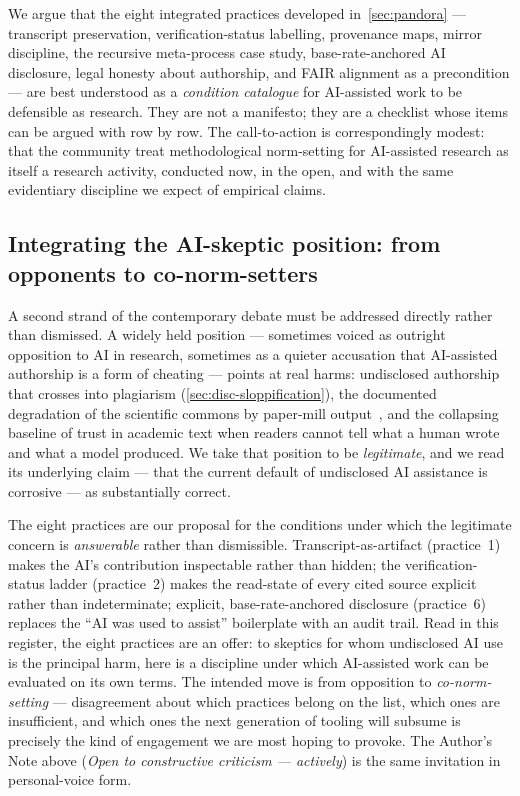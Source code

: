 \documentclass[11pt,a4paper]{article}
\begin{document}
We argue that the eight integrated practices developed in~\cref{sec:pandora}
--- transcript preservation, verification-status labelling, provenance
maps, mirror discipline, the recursive meta-process case study,
base-rate-anchored AI disclosure, legal honesty about authorship, and
FAIR alignment as a precondition --- are best understood as a
\emph{condition catalogue} for AI-assisted work to be defensible as
research. They are not a manifesto; they are a checklist whose items
can be argued with row by row. The call-to-action is correspondingly
modest: that the community treat methodological norm-setting for
AI-assisted research as itself a research activity, conducted now, in
the open, and with the same evidentiary discipline we expect of
empirical claims.

\subsection{Integrating the AI-skeptic position: from opponents to co-norm-setters}
\label{sec:ai-skeptic-integration}

A second strand of the contemporary debate must be addressed directly
rather than dismissed. A widely held position --- sometimes voiced as
outright opposition to AI in research, sometimes as a quieter accusation
that AI-assisted authorship is a form of cheating --- points at real
harms: undisclosed authorship that crosses into plagiarism
(\cref{sec:disc-sloppification}), the documented degradation of the
scientific commons by paper-mill output~\citep{suchak2025nhanes}, and
the collapsing baseline of trust in academic text when readers cannot
tell what a human wrote and what a model produced. We take that
position to be \emph{legitimate}, and we read its underlying claim ---
that the current default of undisclosed AI assistance is corrosive ---
as substantially correct.

The eight practices are our proposal for the conditions under which the
legitimate concern is \emph{answerable} rather than dismissible.
Transcript-as-artifact (practice~1) makes the AI's contribution
inspectable rather than hidden; the verification-status ladder
(practice~2) makes the read-state of every cited source explicit rather
than indeterminate; explicit, base-rate-anchored disclosure
(practice~6) replaces the ``AI was used to assist'' boilerplate with an
audit trail. Read in this register, the eight practices are an offer:
to skeptics for whom undisclosed AI use is the principal harm, here is a
discipline under which AI-assisted work can be evaluated on its own
terms. The intended move is from opposition to \emph{co-norm-setting}
--- disagreement about which practices belong on the list, which ones
are insufficient, and which ones the next generation of tooling will
subsume is precisely the kind of engagement we are most hoping to
provoke. The Author's Note above
(\emph{Open to constructive criticism --- actively}) is the same
invitation in personal-voice form.
\end{document}
